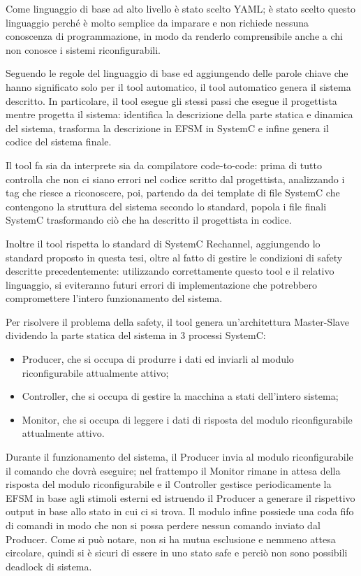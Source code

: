 \documentclass[a4paper,titlepage]{book}
\begin{document}
Come linguaggio di base ad alto livello è stato scelto YAML; è stato scelto questo linguaggio perché è molto semplice da imparare e non richiede nessuna conoscenza di programmazione, in modo da renderlo comprensibile anche a chi non conosce i sistemi riconfigurabili.

Seguendo le regole del linguaggio di base ed aggiungendo delle parole chiave che hanno significato solo per il tool automatico, il tool automatico genera il sistema descritto. In particolare, il tool esegue gli stessi passi che esegue il progettista mentre progetta il sistema: identifica la descrizione della parte statica e dinamica del sistema, trasforma la descrizione in EFSM in SystemC e infine genera il codice del sistema finale.

Il tool fa sia da interprete sia da compilatore code-to-code: prima di tutto controlla che non ci siano errori nel codice scritto dal progettista, analizzando i tag che riesce a riconoscere, poi, partendo da dei template di file SystemC che contengono la struttura del sistema secondo lo standard, popola i file finali SystemC trasformando ciò che ha descritto il progettista in codice.

Inoltre il tool rispetta lo standard di SystemC Rechannel, aggiungendo lo standard proposto in questa tesi, oltre al fatto di gestire le condizioni di safety descritte precedentemente: utilizzando correttamente questo tool e il relativo linguaggio, si eviteranno futuri errori di implementazione che potrebbero compromettere l'intero funzionamento del sistema.

Per risolvere il problema della safety, il tool genera un'architettura Master-Slave dividendo la parte statica del sistema in 3 processi SystemC:

\begin{itemize}
\item Producer, che si occupa di produrre i dati ed inviarli al modulo riconfigurabile attualmente attivo;
\item Controller, che si occupa di gestire la macchina a stati dell'intero sistema;
\item Monitor, che si occupa di leggere i dati di risposta del modulo riconfigurabile attualmente attivo.
\end{itemize}

Durante il funzionamento del sistema, il Producer invia al modulo riconfigurabile il comando che dovrà eseguire; nel frattempo il Monitor rimane in attesa della risposta del modulo riconfigurabile e il Controller gestisce periodicamente la EFSM in base agli stimoli esterni ed istruendo il Producer a generare il rispettivo output in base allo stato in cui ci si trova. Il modulo infine possiede una coda fifo di comandi in modo che non si possa perdere nessun comando inviato dal Producer. Come si può notare, non si ha mutua esclusione e nemmeno attesa circolare, quindi si è sicuri di essere in uno stato safe e perciò non sono possibili deadlock di sistema.
\end{document}
